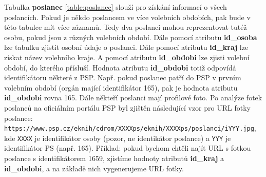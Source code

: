 Tabulka \textbf{poslanec} \ref{table:poslanec} slouží pro získání informací o všech poslancích. Pokud je někdo poslancem ve více volebních obdobích, pak bude v této tabulce mít více záznamů. Tedy dva poslanci mohou reprezentovat tutéž osobu, pokud jsou z různých volebních období. Dále pomocí atributu \textbf{id\_osoba} lze tabulku zjistit osobní údaje o poslanci. Dále pomocí atributu \textbf{id\_kraj} lze získat název volebního kraje. A pomocí atributu \textbf{id\_obdobi} lze zjisti volební období, do kterého přísluší. Hodnota atributu \textbf{id\_obdobi} totiž odpovídá identifikátoru některé z PSP. Např. pokud poslanec patří do PSP v prvním volebním období (orgán mající identifikátor 165), pak je hodnota atributu \textbf{id\_obdobi} rovna 165. Dále někteří poslanci mají profilové foto. Po analýze fotek poslanců na oficiálním portálu PSP byl zjištěn následující vzor pro URL fotky \linebreak poslance: \lstinline|https://www.psp.cz/eknih/cdrom/XXXXps/eknih/XXXXps/poslanci/iYYY.jpg|, kde \lstinline|XXXX| je identifikátor osoby (pozor, ne identikátor poslance) a \lstinline|YYY| je identifikátor PS (např. 165). Příklad: pokud bychom chtěli najít URL s fotkou poslance s identifikátorem 1659, zjistíme hodnoty atributů \textbf{id\_kraj} a \textbf{id\_obdobi}, a na základě nich vygenerujeme URL fotky.

